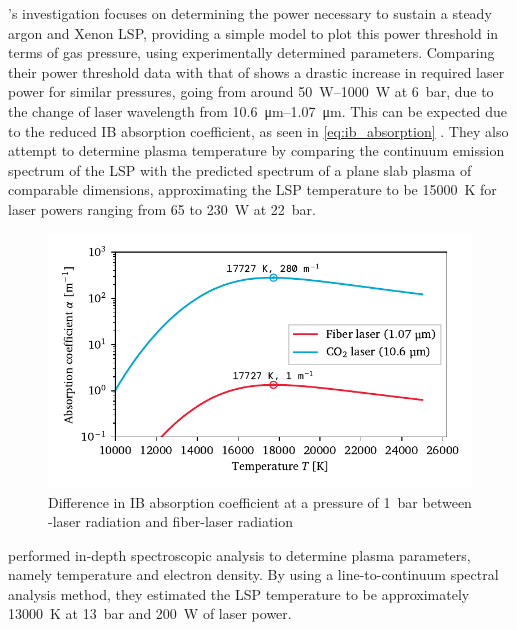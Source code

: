             \textcite{zimakovInteractionNearIRLaser2016}'s investigation focuses on determining the power necessary to sustain a steady argon and Xenon LSP, providing a simple model to plot this power threshold in terms of gas pressure, using experimentally determined parameters. Comparing their power threshold data with that of \textcite{moodyMaintenanceGasBreakdown1975} shows a drastic increase in required laser power for similar pressures, going from around \qtyrange{50}{1000}{W} at \qty{6}{bar}, due to the change of laser wavelength from \qtyrange{10.6}{1.07}{\um}. This can be expected due to the reduced IB absorption coefficient, as seen in \autoref{eq:ib_absorption} . They also attempt to determine plasma temperature by comparing the continuum emission spectrum of the LSP with the predicted spectrum of a plane slab plasma of comparable dimensions, approximating the LSP temperature to be \qty{15000}{K} for laser powers ranging from 65 to \qty{230}{W} at \qty{22}{bar}.

            \begin{figure}[h]
                \centering
                \includegraphics[]{assets/2 background/alphadiff}
                \caption{Difference in IB absorption coefficient at a pressure of \qty{1}{bar} between -laser radiation and fiber-laser radiation}
                \label{fig:alphadiff}
            \end{figure}

            \textcite{luCharacteristicDiagnosticsLaserStabilized2022} performed in-depth spectroscopic analysis to determine plasma parameters, namely temperature and electron density. By using a line-to-continuum spectral analysis method, they estimated the LSP temperature to be approximately \qty{13000}{K} at \qty{13}{bar} and \qty{200}{W} of laser power.

